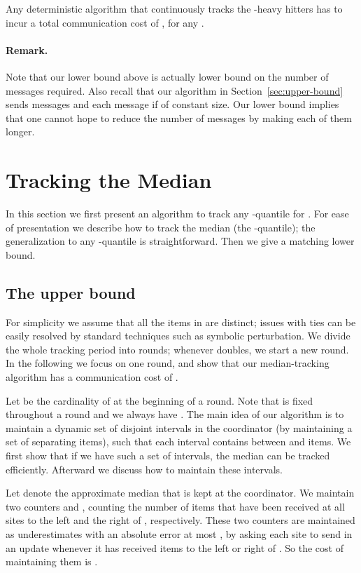 \documentclass[10pt]{article}
\begin{document}
\begin{theorem}
\label{thm:lowerbound-hh}
Any deterministic algorithm that continuously tracks the -heavy
hitters has to incur a total communication cost of , for any .
\end{theorem}

\paragraph{Remark.}
Note that our lower bound above is actually lower bound on the number of
messages required.  Also recall that our algorithm in
Section~\ref{sec:upper-bound} sends  messages and
each message if of constant size.  Our lower bound implies that one cannot
hope to reduce the number of messages by making each of them longer.

 
 


\section{Tracking the Median}
\label{sec:track-median}

In this section we first present an algorithm to track any -quantile
for .  For ease of presentation we describe how to track
the median (the -quantile); the generalization to any -quantile
is straightforward. Then we give a matching lower bound.

\subsection{The upper bound}
For simplicity we assume that all the items in  are distinct; issues
with ties can be easily resolved by standard techniques such as symbolic
perturbation.  We divide the whole tracking period into  rounds;
whenever  doubles, we start a new round.  In the following we focus on
one round, and show that our median-tracking algorithm has a communication
cost of .

Let  be the cardinality of  at the beginning of a round.  Note that
 is fixed throughout a round and we always have . 
The main
idea of our algorithm is to maintain a 
dynamic set of disjoint intervals in the coordinator (by
maintaining a set of separating items), such that each interval
contains between  and  items.
We first show that if we have such a set of intervals, the median
can be tracked efficiently.  Afterward we discuss how to maintain
these intervals.

Let  denote the approximate median that is kept at the coordinator.  We
maintain two counters  and , counting the number
of items that have been received at all sites to the left and the right of
, respectively. These two counters are maintained as underestimates with
an absolute error at most , by asking each site to send
in an update whenever it has received  items to the left
or right of .  So the cost of maintaining them is .
\end{document}
